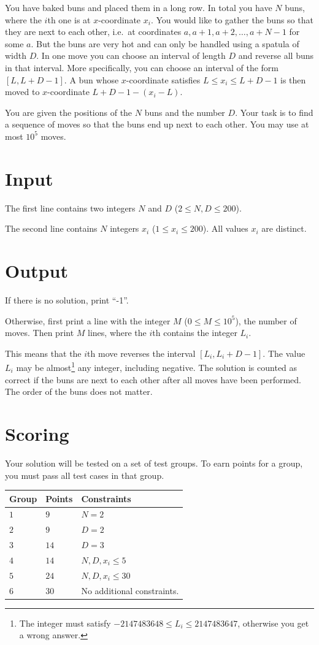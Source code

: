 You have baked buns and placed them in a long row. In total you have $N$ buns, where the $i$th one is at
$x$-coordinate $x_i$. You would like to gather the buns so that they are next to each other, i.e.\
at coordinates $a, a+1, a+2, \dots, a+N-1$ for some $a$. But the buns are very hot and can
only be handled using a spatula of width $D$. In one move you can choose an interval of length
$D$ and reverse all buns in that interval. More specifically, you can choose an interval of the form
$[L, L+D-1]$. A bun whose $x$-coordinate satisfies $L \leq x_i \leq L+D-1$ is then moved to $x$-coordinate
$L + D - 1 - (x_i - L)$.

You are given the positions of the $N$ buns and the number $D$. Your task is to find a sequence of moves
so that the buns end up next to each other. You may use at most $10^5$ moves.


\section*{Input}
The first line contains two integers $N$ and $D$ ($2 \leq N, D \leq 200$).

The second line contains $N$ integers $x_i$ ($1 \leq x_i \leq 200$). All values $x_i$ are distinct.

\section*{Output}
If there is no solution, print ``-1''.

Otherwise, first print a line with the integer $M$ ($0 \leq M \leq 10^5$), the number of moves.
Then print $M$ lines, where the $i$th contains the integer $L_i$.

This means that the $i$th move reverses the interval $[L_i, L_i + D - 1]$.
The value $L_i$ may be almost\footnote{The integer must satisfy $-2147483648 \leq L_i \leq 2147483647$, otherwise you get a wrong answer.} any integer, including negative.
The solution is counted as correct if the buns are next to each other after all moves have been performed.
The order of the buns does not matter.

\section*{Scoring}
Your solution will be tested on a set of test groups.
To earn points for a group, you must pass all test cases in that group.

\noindent
\begin{tabular}{| l | l | l |}
  \hline
  Group & Points & Constraints \\ \hline
  $1$    & $9$        &  $N=2$ \\ \hline
  $2$    & $9$        &  $D=2$ \\ \hline
  $3$    & $14$        &  $D=3$ \\ \hline
  $4$    & $14$        &  $N, D, x_i \leq 5$ \\ \hline
  $5$    & $24$        &  $N, D, x_i \leq 30$ \\ \hline
  $6$    & $30$        &  No additional constraints. \\ \hline
\end{tabular}

